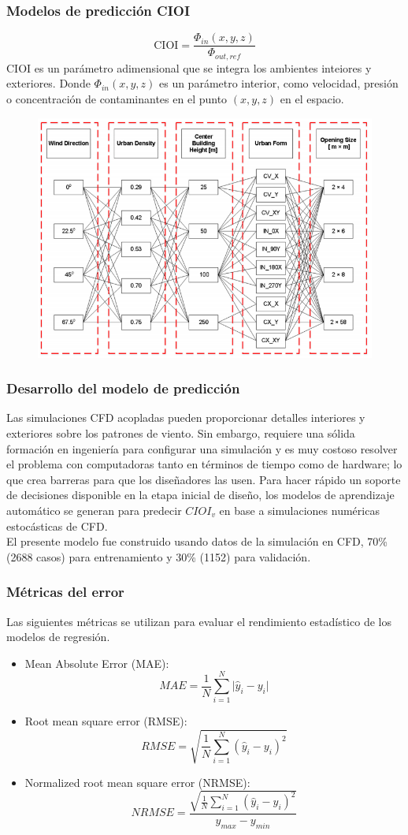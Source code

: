 \documentclass[10pt]{beamer}
\begin{document}
\begin{frame}
\frametitle{Modelos de predicción CIOI}
$$
\mathrm{CIOI} = \frac{\Phi_{in}(x,y,z)}{\Phi_{out,ref}}
$$
CIOI es un parámetro adimensional que se integra los ambientes inteiores y exteriores. Donde $\Phi_{in}(x,y,z)$ es un parámetro interior, como velocidad, presión o concentración de contaminantes en el punto $(x,y,z)$ en el espacio.
\begin{figure}[H]
\centering
\includegraphics[scale=0.26]{denselayer.png}
\end{figure}
\end{frame}
\begin{frame}[fragile]
\frametitle{Desarrollo del modelo de predicción}
Las simulaciones CFD acopladas pueden proporcionar detalles interiores y exteriores sobre los patrones de viento. Sin embargo, requiere una sólida formación en ingeniería para configurar una simulación y es muy costoso resolver el problema con computadoras tanto en términos de tiempo como de hardware; lo que crea barreras para que los diseñadores las usen. Para hacer rápido un soporte de decisiones disponible en la etapa inicial de diseño, los modelos de aprendizaje automático se generan para predecir $CIOI_{v}$ en base a simulaciones numéricas estocásticas de CFD.\\
El presente modelo fue construido usando datos de la simulación en CFD, 70\% (2688 casos) para entrenamiento y 30\% (1152) para validación.
\end{frame}
\begin{frame}
\frametitle{Métricas del error}
Las siguientes métricas se utilizan para evaluar el rendimiento estadístico de los modelos de regresión.
\begin{itemize}
\item Mean Absolute Error (MAE):
$$
MAE = \frac{1}{N} \sum_{i=1}^{N} \vert \widehat{y}_{i} - y_{i} \vert
$$
\item Root mean square error (RMSE):
$$
RMSE = \sqrt{\frac{1}{N} \sum_{i=1}^{N} (\widehat{y}_{i} - y_{i})^{2}}
$$
\item Normalized root mean square error (NRMSE):
$$
NRMSE = \frac{\sqrt{\frac{1}{N} \sum_{i=1}^{N} (\widehat{y}_{i} - y_{i})^{2}}}{y_{max}-y_{min}}
$$
\end{itemize}
\end{frame}
\end{document}
